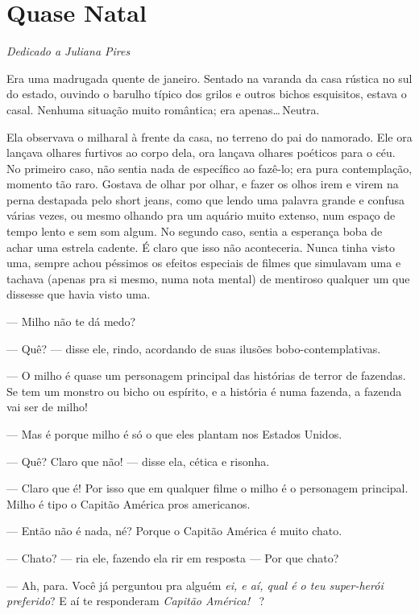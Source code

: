 \chapter{Quase Natal}

\begin{flushright}
\emph{Dedicado a Juliana Pires}
\end{flushright}

Era uma madrugada quente de janeiro. Sentado na varanda da casa rústica no sul do estado, ouvindo o barulho típico dos grilos e outros bichos esquisitos, estava o casal. Nenhuma situação muito romântica; era apenas\ldots\,Neutra.

Ela observava o milharal à frente da casa, no terreno do pai do namorado. Ele ora lançava olhares furtivos ao corpo dela, ora lançava olhares poéticos para o céu. No primeiro caso, não sentia nada de específico ao fazê-lo; era pura contemplação, momento tão raro. Gostava de olhar por olhar, e fazer os olhos irem e virem na perna destapada pelo short jeans, como que lendo uma palavra grande e confusa várias vezes, ou mesmo olhando pra um aquário muito extenso, num espaço de tempo lento e sem som algum. No segundo caso, sentia a esperança boba de achar uma estrela cadente. É claro que isso não aconteceria. Nunca tinha visto uma, sempre achou péssimos os efeitos especiais de filmes que simulavam uma e tachava (apenas pra si mesmo, numa nota mental) de mentiroso qualquer um que dissesse que havia visto uma.

--- Milho não te dá medo?

--- Quê? --- disse ele, rindo, acordando de suas ilusões bobo-contemplativas.

--- O milho é quase um personagem principal das histórias de terror de fazendas. Se tem um monstro ou bicho ou espírito, e a história é numa fazenda, a fazenda vai ser de milho!

--- Mas é porque milho é só o que eles plantam nos Estados Unidos.

--- Quê? Claro que não! --- disse ela, cética e risonha.

--- Claro que é! Por isso que em qualquer filme o milho é o personagem principal. Milho é tipo o Capitão América pros americanos.

--- Então não é nada, né? Porque o Capitão América é muito chato.

--- Chato? --- ria ele, fazendo ela rir em resposta --- Por que chato?

--- Ah, para. Você já perguntou pra alguém \emph{ei, e aí, qual é o teu super-herói preferido}? E aí te responderam \emph{Capitão América!} \ ?

